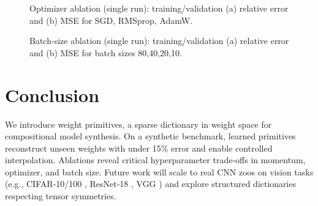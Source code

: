 \documentclass{article}
\begin{document}
\begin{figure}[h]
  \centering
  \caption{Optimizer ablation (single run): training/validation (a) relative error and (b) MSE for SGD, RMSprop, AdamW.}
  \label{fig:opt_ablation}
\end{figure}

\begin{figure}[h]
  \centering
  \caption{Batch‐size ablation (single run): training/validation (a) relative error and (b) MSE for batch sizes 80,40,20,10.}
  \label{fig:batch_ablation}
\end{figure}

\section{Conclusion}
We introduce weight primitives, a sparse dictionary in weight space for compositional model synthesis.  On a synthetic benchmark, learned primitives reconstruct unseen weights with under 15\% error and enable controlled interpolation.  Ablations reveal critical hyperparameter trade‐offs in momentum, optimizer, and batch size.  Future work will scale to real CNN zoos on vision tasks (e.g., CIFAR‐10/100 \citep{krizhevsky2009learningml}, ResNet‐18 \citep{he2015deeprl}, VGG \citep{simonyan2014verydc}) and explore structured dictionaries respecting tensor symmetries.
\end{document}
